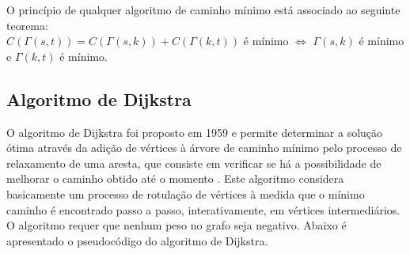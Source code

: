 O princípio de qualquer algoritmo de caminho mínimo está associado ao seguinte teorema:\\
\FloatBarrier
$C(\Gamma(s,t)) = C(\Gamma(s,k)) + C(\Gamma(k,t))$ é mínimo $\Longleftrightarrow$ $\Gamma(s,k)$ é mínimo e $\Gamma(k,t)$ é mínimo.

\subsection{Algoritmo de Dijkstra}
O algoritmo de Dijkstra foi proposto em 1959 e permite determinar a solução ótima através da adição de
vértices à árvore de caminho mínimo pelo processo de relaxamento de uma aresta, que consiste em verificar
se há a possibilidade de melhorar o caminho obtido até o momento \cite{boaventura}. Este algoritmo considera
basicamente um processo de rotulação de vértices à medida que o mínimo caminho é encontrado passo a passo,
interativamente, em vértices intermediários. O algoritmo requer que nenhum peso no grafo seja negativo. Abaixo
é apresentado o pseudocódigo do algoritmo de Dijkstra.
\FloatBarrier
